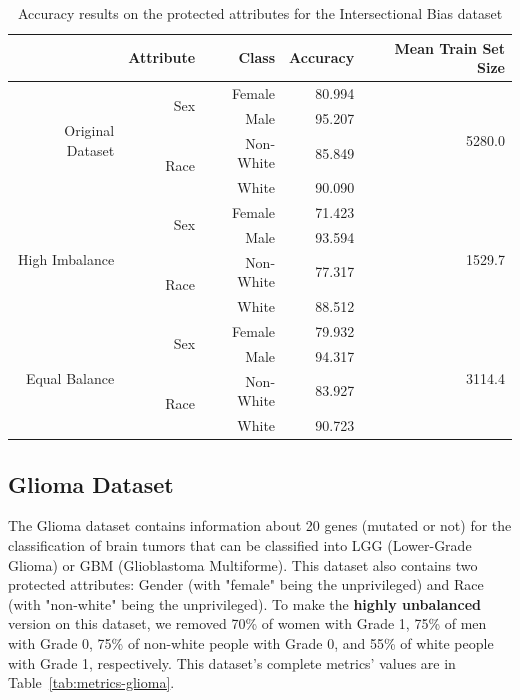 \documentclass[12pt]{article}
\begin{document}
\begin{table}[ht]
  \centering
  \begin{tabular}{@{}rrrrr@{}}
  \toprule
                                    & Attribute             & Class     & Accuracy  & Mean Train Set Size     \\ \midrule
  \multirow{4}{*}{Original Dataset} & \multirow{2}{*}{Sex}  & Female    & 80.994 & \multirow{4}{*}{5280.0} \\
                                    &                       & Male      & 95.207 &                         \\
                                    & \multirow{2}{*}{Race} & Non-White & 85.849 &                         \\
                                    &                       & White     & 90.090 &                         \\ \midrule
  \multirow{4}{*}{High Imbalance}   & \multirow{2}{*}{Sex}  & Female    & 71.423 & \multirow{4}{*}{1529.7} \\
                                    &                       & Male      & 93.594 &                         \\
                                    & \multirow{2}{*}{Race} & Non-White & 77.317 &                         \\
                                    &                       & White     & 88.512 &                         \\ \midrule
  \multirow{4}{*}{Equal Balance}    & \multirow{2}{*}{Sex}  & Female    & 79.932 & \multirow{4}{*}{3114.4} \\
                                    &                       & Male      & 94.317 &                         \\
                                    & \multirow{2}{*}{Race} & Non-White & 83.927 &                         \\
                                    &                       & White     & 90.723 &                         \\ \bottomrule
  \end{tabular}
  \caption{Accuracy results on the protected attributes for the Intersectional Bias dataset}
  \label{tab:acc-intersectional}
\end{table}



\subsection{Glioma Dataset}
\label{sec:glioma}
The Glioma dataset contains information about 20 genes (mutated or not) for the classification of brain tumors that can be classified into LGG (Lower-Grade Glioma) or GBM (Glioblastoma Multiforme). This dataset also contains two protected attributes: Gender (with "female" being the unprivileged) and Race (with "non-white" being the unprivileged). To make the \textbf{highly unbalanced} version on this dataset, we removed 70\% of women with Grade 1, 75\% of men with Grade 0, 75\% of non-white people with Grade 0, and 55\% of white people with Grade 1, respectively. This dataset's complete metrics' values are in Table~\ref{tab:metrics-glioma}. 
\end{document}
